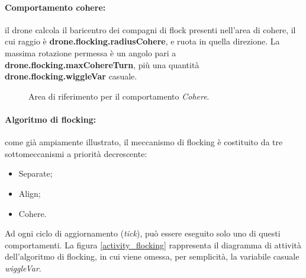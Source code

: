 \paragraph{Comportamento cohere:} il drone calcola il baricentro dei compagni di flock presenti nell'area di cohere, il cui raggio è \textbf{drone.flocking.radiusCohere}, e ruota in quella direzione.
La massima rotazione permessa è un angolo pari a \textbf{drone.flocking.maxCohereTurn}, più una quantità \textbf{drone.flocking.wiggleVar} casuale.

\begin{figure}[H] 
    \captionsetup{justification=centering, margin=2cm, font=footnotesize}
    \begin{center}
    \end{center}
    \caption[short]{Area di riferimento per il comportamento \textit{Cohere}.}
    \label{cohere}
\end{figure}

\paragraph{Algoritmo di flocking:} come già ampiamente illustrato, il meccanismo di flocking è costituito da tre sottomeccanismi a priorità decrescente:
\begin{itemize}
    \item Separate;
    \item Align;
    \item Cohere.
\end{itemize}

Ad ogni ciclo di aggiornamento (\textit{tick}), può essere eseguito solo uno di questi comportamenti.
La figura \ref{activity_flocking} rappresenta il diagramma di attività dell'algoritmo di flocking, in cui viene omessa, per semplicità, la variabile casuale \textit{wiggleVar}.

